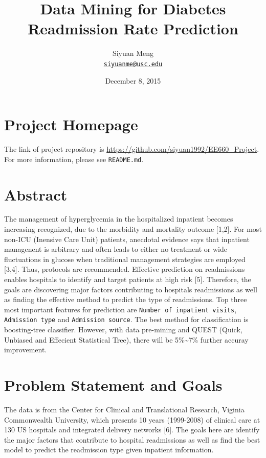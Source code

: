 \documentclass[]{article}
\title{Data Mining for Diabetes Readmission Rate Prediction}
\author{Siyuan Meng \\ \href{mailto:siyuanme@usc.edu}{\nolinkurl{siyuanme@usc.edu}}}
\date{December 8, 2015}
\begin{document}
\maketitle


\section{Project Homepage}\label{project-homepage}

The link of project repository is
\url{https://github.com/siyuan1992/EE660_Project}. For more information,
please see \texttt{README.md}.

\section{Abstract}\label{abstract}

The management of hyperglycemia in the hospitalized inpatient becomes
increasing recognized, due to the morbidity and mortality outcome
{[}1,2{]}. For most non-ICU (Inensive Care Unit) patients, anecdotal
evidence says that inpatient managenent is arbitrary and often leads to
either no treatment or wide fluctuations in glucose when traditional
management strategies are employed {[}3,4{]}. Thus, protocols are
recommended. Effective prediction on readmissions enables hospitals to
identify and target patients at high risk {[}5{]}. Therefore, the goals
are discovering major factors contributing to hospitals readmissions as
well as finding the effective method to predict the type of
readmissions. Top three most important features for prediction are
\texttt{Number of inpatient visits}, \texttt{Admission type} and
\texttt{Admission source}. The best method for classification is
boosting-tree classifier. However, with data pre-mining and QUEST
(Quick, Unbiased and Effecient Statistical Tree), there will be
5\%\textasciitilde{}7\% further accuray improvement.

\section{Problem Statement and Goals}\label{problem-statement-and-goals}

The data is from the Center for Clinical and Translational Research,
Viginia Commonwealth University, which presents 10 years (1999-2008) of
clinical care at 130 US hospitals and integrated delivery networks
{[}6{]}. The goals here are identify the major factors that contribute
to hospital readmissions as well as find the best model to predict the
readmission type given inpatient information.
\end{document}

